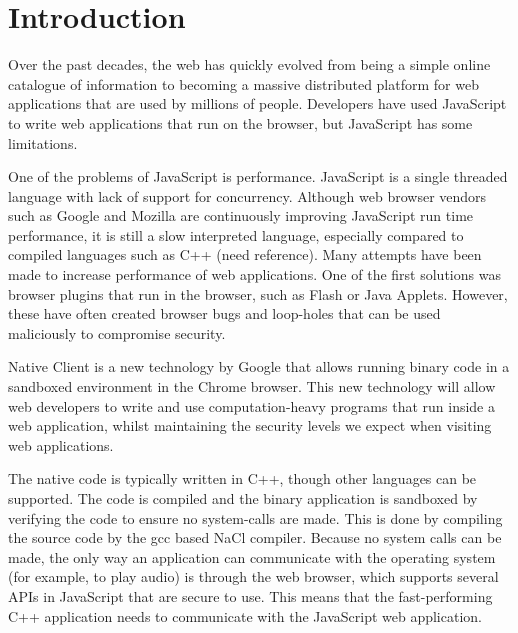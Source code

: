 
\chapter{Introduction} %

\label{Chapter1} %

Over the past decades, the web has quickly evolved from being a simple online catalogue of information to becoming a massive distributed platform for web applications that are used by millions of people. Developers have used JavaScript to write web applications that run on the browser, but JavaScript has some limitations. 

One of the problems of JavaScript is performance. JavaScript is a single threaded language with lack of support for concurrency. Although web browser vendors such as Google and Mozilla are continuously improving JavaScript run time performance, it is still a slow interpreted language, especially compared to compiled languages such as C++ (need reference). Many attempts have been made to increase performance of web applications. One of the first solutions was browser plugins that run in the browser, such as Flash or Java Applets. However, these have often created browser bugs and loop-holes that can be used maliciously to compromise security.

Native Client \cite{yee2009native} is a new technology by Google that allows running binary code in a sandboxed environment in the Chrome browser. This new technology will allow web developers to write and use computation-heavy programs that run inside a web application, whilst maintaining the security levels we expect when visiting web applications.

The native code is typically written in C++, though other languages can be supported. The code is compiled and the binary application is sandboxed by verifying the code to ensure no system-calls are made. This is done by compiling the source code by the gcc based NaCl compiler. Because no system calls can be made, the only way an application can communicate with the operating system (for example, to play audio) is through the web browser, which supports several APIs in JavaScript that are secure to use. This means that the fast-performing C++ application needs to communicate with the JavaScript web application.

